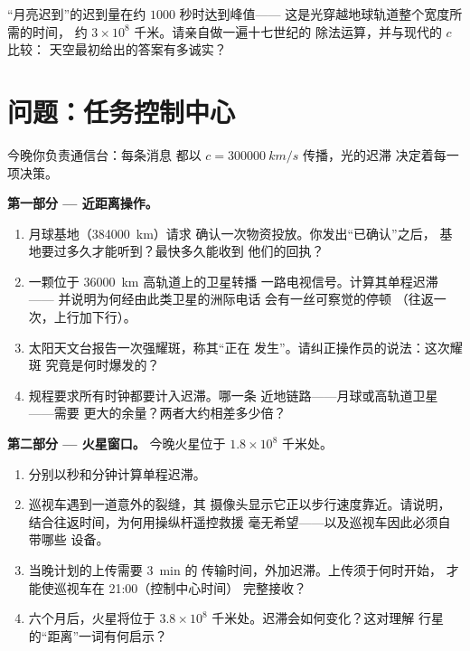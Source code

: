\begin{exercise}[$\star\star\star$]\label{exo:g8:speed-of-light:12}
“月亮迟到”的迟到量在约 $1000$ 秒时达到峰值——
这是光穿越地球轨道整个宽度所需的时间，
约 $3 \times 10^{8}$ 千米。请亲自做一遍十七世纪的
除法运算，并与现代的 $c$ 比较：
天空最初给出的答案有多诚实？
\end{exercise}

\section{问题：任务控制中心}

\begin{problem}\label{pb:g8:speed-of-light:1}
今晚你负责通信台：每条消息
都以 $c = \qty{300000}{km/s}$ 传播，光的迟滞
决定着每一项决策。

\medskip\noindent\textbf{第一部分 --- 近距离操作。}
\begin{enumerate}
  \item 月球基地（\qty{384000}{km}）请求
        确认一次物资投放。你发出“已确认”之后，
        基地要过多久才能听到？最快多久能收到
        他们的回执？
  \item 一颗位于 \qty{36000}{km} 高轨道上的卫星转播
        一路电视信号。计算其单程迟滞——
        并说明为何经由此类卫星的洲际电话
        会有一丝可察觉的停顿
        （往返一次，上行加下行）。
  \item 太阳天文台报告一次强耀斑，称其“正在
        发生”。请纠正操作员的说法：这次耀斑
        究竟是何时爆发的？
  \item 规程要求所有时钟都要计入迟滞。哪一条
        近地链路——月球或高轨道卫星——需要
        更大的余量？两者大约相差多少倍？
\end{enumerate}

\medskip\noindent\textbf{第二部分 --- 火星窗口。}
今晚火星位于 $1.8 \times 10^{8}$ 千米处。
\begin{enumerate}[resume]
  \item 分别以秒和分钟计算单程迟滞。
  \item 巡视车遇到一道意外的裂缝，其
        摄像头显示它正以步行速度靠近。请说明，
        结合往返时间，为何用操纵杆遥控救援
        毫无希望——以及巡视车因此必须自带哪些
        设备。
  \item 当晚计划的上传需要 \qty{3}{min} 的
        传输时间，外加迟滞。上传须于何时开始，
        才能使巡视车在 21:00（控制中心时间）
        完整接收？
  \item 六个月后，火星将位于 $3.8 \times
        10^{8}$ 千米处。迟滞会如何变化？这对理解
        行星的“距离”一词有何启示？
\end{enumerate}


\end{problem}
